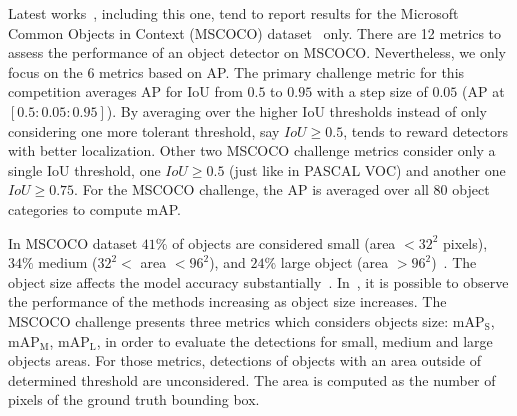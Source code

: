 Latest works~\cite{He2017mask}, including this one, tend to report results for the Microsoft Common Objects in Context (MSCOCO) dataset~\cite{MSCOCO2014} only.
There are 12 metrics to assess the performance of an object detector on MSCOCO.
Nevertheless, we only focus on the 6 metrics based on AP.
The primary challenge metric for this competition averages AP for IoU from $0.5$ to $0.95$ with a step size of $0.05$ (AP at $[0.5:0.05:0.95]$).
By averaging over the higher IoU thresholds instead of only considering one more tolerant threshold, say $IoU \geq 0.5$, tends to reward detectors with better localization.
Other two MSCOCO challenge metrics consider only a single IoU threshold, one $IoU \geq 0.5$ (just like in PASCAL VOC) and another one $IoU \geq 0.75$.
For the MSCOCO challenge, the AP is averaged over all 80 object categories to compute mAP.

In MSCOCO dataset $41\%$ of objects are considered small (area $< 32^2$ pixels), $34\%$  medium ($32^2 < $ area $< 96^2$), and $24\%$  large object (area $> 96^2$)~\cite{MSCOCO2014}.
The object size affects the model accuracy substantially~\cite{Everingham10}.
In~\cite{Everingham10, He2017mask}, it is possible to observe the performance of the methods increasing as object size increases.
The MSCOCO challenge presents three metrics which considers objects size: mAP$_{\textrm{S}}$, mAP$_{\textrm{M}}$, mAP$_{\textrm{L}}$, in order to evaluate the detections for small, medium and large objects areas.
For those metrics, detections of objects with an area outside of determined threshold are unconsidered.
The area is computed as the number of pixels of the ground truth bounding box.

%

